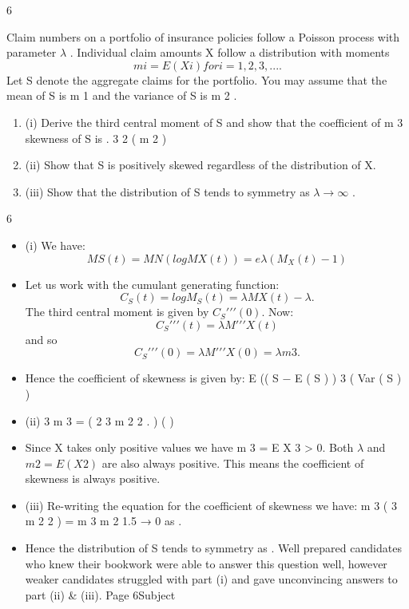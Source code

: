 \documentclass[a4paper,12pt]{article}
\begin{document}
6

Claim numbers on a portfolio of insurance policies follow a Poisson process with
parameter $\lambda$ . Individual claim amounts X follow a distribution with moments
\[m i = E ( X i ) for i = 1, 2, 3, ... .\] Let S denote the aggregate claims for the portfolio.
You may assume that the mean of S is \lambda m 1 and the variance of S is \lambda m 2 .
\begin{enumerate}
\item (i)
Derive the third central moment of S and show that the coefficient of
\lambda m 3
skewness of S is
.
3
2
( \lambda m 2 ) 
\item (ii) Show that S is positively skewed regardless of the distribution of X. 

\item (iii) Show that the distribution of S tends to symmetry as $\lambda \rightarrow \infty$ .
\end{enumerate}

\newpage

6
\begin{itemize}
\item (i)
We have:
\[M S ( t ) = M N (log M X ( t )) = e
\lambda ( M_X ( t ) − 1)\]
\item  Let us work with the cumulant generating function:
\[C_{S} ( t ) = log M_S ( t ) = \lambda M X ( t ) − \lambda .\]
The third central moment is given by $C_{S} \prime \prime \prime  (0)$.
Now:
\[C_S \prime \prime \prime  ( t ) = \lambda M \prime \prime \prime  X ( t )\]
and so
\[C_{S} \prime  \prime \prime  ( 0 ) = \lambda M \prime \prime \prime  X ( 0 ) = \lambda m 3 .\]
\item  Hence the coefficient of skewness is given by:
E (( S − E ( S ) ) 3
( Var ( S ) )

\item (ii)
3
\lambda m 3
=
(
2
3
\lambda m 2 2
.
)
( )
\item  Since X takes only positive values we have m 3 = E X 3 > 0.
Both $\lambda$ and $m 2 = E ( X 2 )$ are also always positive.
This means the coefficient of skewness is always positive.
\item  (iii)
Re-writing the equation for the coefficient of skewness we have:
\lambda m 3
(
3
\lambda m 2 2
)
=
m 3
m 2 1.5
→ 0 as \lambda \rightarrow \infty .
\item  Hence the distribution of S tends to symmetry as \lambda \rightarrow \infty .
Well prepared candidates who knew their bookwork were able to answer this question well,
however weaker candidates struggled with part (i) and gave unconvincing answers to part
(ii) & (iii).
Page 6Subject %
\end{itemize}
\end{document}
